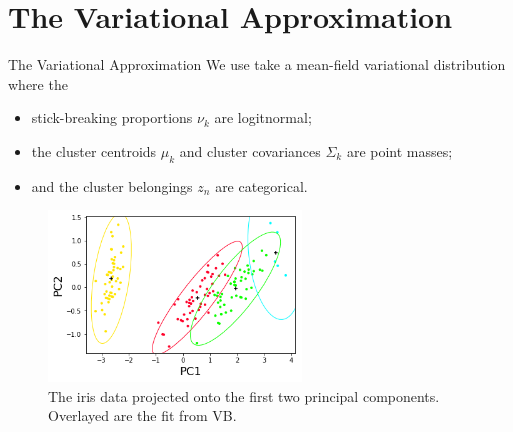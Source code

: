 \documentclass[10pt]{beamer}\usepackage[]{graphicx}\usepackage[]{color}
\begin{document}
\section{The Variational Approximation}

\begin{frame}{The Variational Approximation}
We use take a mean-field variational distribution where the 
\begin{itemize}
\item stick-breaking proportions $\nu_k$ are logitnormal; 
\item the cluster centroids $\mu_k$ and cluster covariances $\Sigma_k$ are point masses; 
\item and the cluster belongings $z_n$ are categorical. 
\end{itemize}

\begin{figure}[!h]
\centering
\includegraphics[width = 0.6\textwidth]{./images/iris_vb_fit.png}
\caption{The iris data projected onto the first two principal components. Overlayed are the fit from VB. }
\setlength{\textfloatsep}{-10pt}
\end{figure}

\end{frame}

\end{document}
